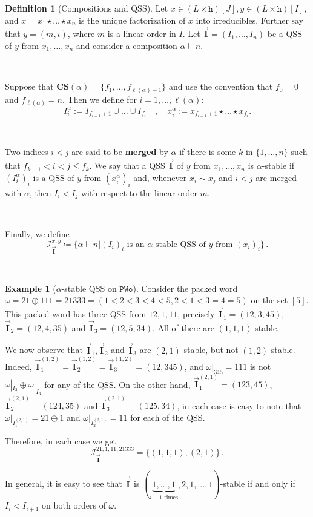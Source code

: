 \documentclass[12pt, reqno]{amsart}
\theoremstyle{definition}
\newtheorem{defin}[thm]{Definition}
\newtheorem{smpl}[thm]{Example}
\newcommand{\III}{\vec{\mathbf{I}}}
\begin{document}
\begin{defin}[Compositions and QSS]
Let $x \in (L\times \mathtt{h})[J], y \in (L\times \mathtt{h})[I]$, and $x = x_1\star \dots \star x_n$ is the unique factorization of $x$ into irreducibles.
Further say that $y = (m, \iota)$, where $m$ is a linear order in $I$.
Let $\III = (I_1, \dots , I_n)$ be a QSS of $y$ from $x_1, \dots, x_n$ and consider a composition $\alpha \models n$.

\

Suppose that $ \mathbf{CS} (\alpha) = \{f_1, \dots, f_{\ell(\alpha) - 1} \}$ and use the convention that $f_0 = 0$ and $f_{\ell(\alpha)} = n$. 
Then we define for $i = 1, \dots, \ell(\alpha)$:
\[I^{\alpha}_i := I_{f_{i-1} + 1} \cup \dots \cup I_{f_i} \quad , \quad x^{\alpha}_i := x_{f_{i-1} + 1} \star \dots \star x_{f_i}.\]

\

Two indices $i< j$ are said to be \textbf{merged} by $\alpha$ if there is some $k$ in $\{1, \dots, n\}$ such that $ f_{k-1} < i < j \leq f_k$.
We say that a QSS $\III$ of $y$ from $x_1, \dots , x_n$ is $\alpha $-stable if $(I^{\alpha}_i)_i \text{ is a QSS of $y$ from } (x^{\alpha}_i)_i$ and, whenever $x_i \sim x_j$ and $i < j$ are merged with $\alpha $, then $I_i < I_j$ with respect to the linear order $m$.

\

Finally, we define 
$$\mathcal I^{x, y}_{\III} \coloneqq \{ \alpha \models n | (I_i)_i \text{ is an $\alpha$-stable QSS of $y$ from } (x_i)_i \} \, .$$

\end{defin}

\

\begin{smpl}[$\alpha$-stable QSS on $\mathtt{PWo}$]
Consider the packed word $\omega = 21 \oplus 111 = 21333 = (1 < 2 < 3 < 4 < 5, 2 < 1 < 3 = 4 = 5)$ on the set $[5]$.
This packed word has three QSS from $12, 1, 11$, precisely $\III_1 =(12, 3, 45)$, $\III_2 =(12, 4, 35)$ and $\III_3 =(12, 5, 34)$.
All of there are $(1, 1, 1)$-stable.

We now observe that $\III_1, \III_2$ and $\III_3$ are $(2, 1)$-stable, but not $(1, 2)$-stable.
Indeed, $\III_1^{(1, 2)} = \III_2^{(1, 2)} = \III_3^{(1, 2)} = (12, 345)$, and $\omega|_{345} = 111$ is not $\omega|_{I_2} \oplus \omega|_{I_3}$ for any of the QSS.
On the other hand, $\III_1^{(2, 1)} = (123, 45)$, $\III_2^{(2, 1)} = (124, 35)$ and $\III_3^{(2, 1)} = (125, 34)$, in each case is easy to note that $\omega|_{I_1^{(2, 1)}} = 21\oplus 1$ and $\omega|_{I_2^{(2, 1)}} = 11$ for each of the QSS.

Therefore, in each case we get
$$\mathcal I_{\III}^{21, 1, 11, 21333} = \{(1, 1, 1), (2, 1)\}\, . $$

In general, it is easy to see that $\III $ is $(\underbrace{1, \dots , 1}_\text{$i-1$ times}, 2, 1, \dots, 1)$-stable if and only if $I_i < I_{i+1}$ on both orders of $\omega$.
\end{smpl}
\end{document}
